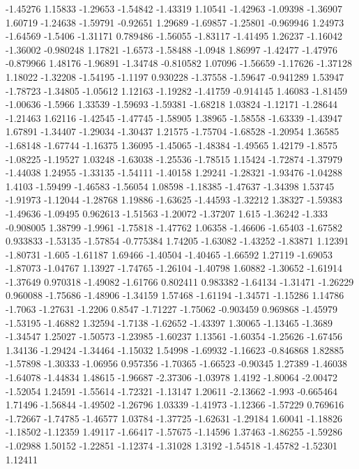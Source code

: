 \documentclass[9pt]{article}
\theoremstyle{plain}
\theoremstyle{definition}
\theoremstyle{remark}
\numberwithin{equation}{section}
\begin{document}
-1.45276
1.15833
-1.29653
-1.54842
-1.43319
1.10541
-1.42963
-1.09398
-1.36907
1.60719
-1.24638
-1.59791
-0.92651
1.29689
-1.69857
-1.25801
-0.969946
1.24973
-1.64569
-1.5406
-1.31171
0.789486
-1.56055
-1.83117
-1.41495
1.26237
-1.16042
-1.36002
-0.980248
1.17821
-1.6573
-1.58488
-1.0948
1.86997
-1.42477
-1.47976
-0.879966
1.48176
-1.96891
-1.34748
-0.810582
1.07096
-1.56659
-1.17626
-1.37128
1.18022
-1.32208
-1.54195
-1.1197
0.930228
-1.37558
-1.59647
-0.941289
1.53947
-1.78723
-1.34805
-1.05612
1.12163
-1.19282
-1.41759
-0.914145
1.46083
-1.81459
-1.00636
-1.5966
1.33539
-1.59693
-1.59381
-1.68218
1.03824
-1.12171
-1.28644
-1.21463
1.62116
-1.42545
-1.47745
-1.58905
1.38965
-1.58558
-1.63339
-1.43947
1.67891
-1.34407
-1.29034
-1.30437
1.21575
-1.75704
-1.68528
-1.20954
1.36585
-1.68148
-1.67744
-1.16375
1.36095
-1.45065
-1.48384
-1.49565
1.42179
-1.8575
-1.08225
-1.19527
1.03248
-1.63038
-1.25536
-1.78515
1.15424
-1.72874
-1.37979
-1.44038
1.24955
-1.33135
-1.54111
-1.40158
1.29241
-1.28321
-1.93476
-1.04288
1.4103
-1.59499
-1.46583
-1.56054
1.08598
-1.18385
-1.47637
-1.34398
1.53745
-1.91973
-1.12044
-1.28768
1.19886
-1.63625
-1.44593
-1.32212
1.38327
-1.59383
-1.49636
-1.09495
0.962613
-1.51563
-1.20072
-1.37207
1.615
-1.36242
-1.333
-0.908005
1.38799
-1.9961
-1.75818
-1.47762
1.06358
-1.46606
-1.65403
-1.67582
0.933833
-1.53135
-1.57854
-0.775384
1.74205
-1.63082
-1.43252
-1.83871
1.12391
-1.80731
-1.605
-1.61187
1.69466
-1.40504
-1.40465
-1.66592
1.27119
-1.69053
-1.87073
-1.04767
1.13927
-1.74765
-1.26104
-1.40798
1.60882
-1.30652
-1.61914
-1.37649
0.970318
-1.49082
-1.61766
0.802411
0.983382
-1.64134
-1.31471
-1.26229
0.960088
-1.75686
-1.48906
-1.34159
1.57468
-1.61194
-1.34571
-1.15286
1.14786
-1.7063
-1.27631
-1.2206
0.8547
-1.71227
-1.75062
-0.903459
0.969868
-1.45979
-1.53195
-1.46882
1.32594
-1.7138
-1.62652
-1.43397
1.30065
-1.13465
-1.3689
-1.34547
1.25027
-1.50573
-1.23985
-1.60237
1.13561
-1.60354
-1.25626
-1.67456
1.34136
-1.29424
-1.34464
-1.15032
1.54998
-1.69932
-1.16623
-0.846868
1.82885
-1.57898
-1.30333
-1.06956
0.957356
-1.70365
-1.66523
-0.90345
1.27389
-1.46038
-1.64078
-1.44834
1.48615
-1.96687
-2.37306
-1.03978
1.4192
-1.80064
-2.00472
-1.52054
1.24591
-1.55614
-1.72321
-1.13147
1.20611
-2.13662
-1.993
-0.665464
1.71496
-1.56844
-1.49502
-1.26796
1.03339
-1.41973
-1.12366
-1.57229
0.769616
-1.72667
-1.74785
-1.46577
1.03784
-1.37725
-1.62631
-1.29184
1.60041
-1.18826
-1.18502
-1.12359
1.49117
-1.66417
-1.57675
-1.14596
1.37463
-1.86255
-1.59286
-1.02988
1.50152
-1.22851
-1.12374
-1.31028
1.3192
-1.54518
-1.45782
-1.52301
1.12411
\end{document}
